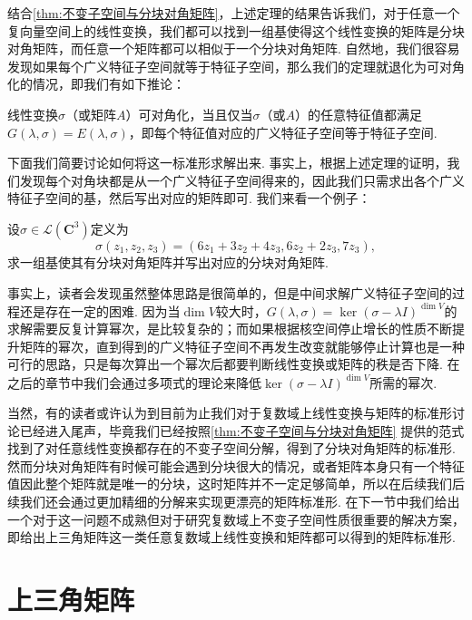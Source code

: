结合\autoref{thm:不变子空间与分块对角矩阵}，上述定理的结果告诉我们，对于任意一个复向量空间上的线性变换，我们都可以找到一组基使得这个线性变换的矩阵是分块对角矩阵，而任意一个矩阵都可以相似于一个分块对角矩阵. 自然地，我们很容易发现如果每个广义特征子空间就等于特征子空间，那么我们的定理就退化为可对角化的情况，即我们有如下推论：
\begin{corollary}{}{}
    线性变换$\sigma$（或矩阵$A$）可对角化，当且仅当$\sigma$（或$A$）的任意特征值都满足$G(\lambda,\sigma)=E(\lambda,\sigma)$，即每个特征值对应的广义特征子空间等于特征子空间.
\end{corollary}

下面我们简要讨论如何将这一标准形求解出来. 事实上，根据上述定理的证明，我们发现每个对角块都是从一个广义特征子空间得来的，因此我们只需求出各个广义特征子空间的基，然后写出对应的矩阵即可. 我们来看一个例子：
\begin{example}{}{}
    设$\sigma\in \mathcal{L}(\mathbf{C}^3)$定义为
    \[\sigma(z_1,z_2,z_3)=(6z_1+3z_2+4z_3,6z_2+2z_3,7z_3),\]求一组基使其有分块对角矩阵并写出对应的分块对角矩阵.
\end{example}

\begin{solution}

\end{solution}

事实上，读者会发现虽然整体思路是很简单的，但是中间求解广义特征子空间的过程还是存在一定的困难. 因为当$\dim V$较大时，$G(\lambda,\sigma)=\ker (\sigma-\lambda I)^{\dim V}$的求解需要反复计算幂次，是比较复杂的；而如果根据核空间停止增长的性质不断提升矩阵的幂次，直到得到的广义特征子空间不再发生改变就能够停止计算也是一种可行的思路，只是每次算出一个幂次后都要判断线性变换或矩阵的秩是否下降. 在之后的章节中我们会通过多项式的理论来降低$\ker (\sigma-\lambda I)^{\dim V}$所需的幂次.

当然，有的读者或许认为到目前为止我们对于复数域上线性变换与矩阵的标准形讨论已经进入尾声，毕竟我们已经按照\autoref{thm:不变子空间与分块对角矩阵} 提供的范式找到了对任意线性变换都存在的不变子空间分解，得到了分块对角矩阵的标准形. 然而分块对角矩阵有时候可能会遇到分块很大的情况，或者矩阵本身只有一个特征值因此整个矩阵就是唯一的分块，这时矩阵并不一定足够简单，所以在后续我们后续我们还会通过更加精细的分解来实现更漂亮的矩阵标准形. 在下一节中我们给出一个对于这一问题不成熟但对于研究复数域上不变子空间性质很重要的解决方案，即给出上三角矩阵这一类任意复数域上线性变换和矩阵都可以得到的矩阵标准形.

\section{上三角矩阵}

